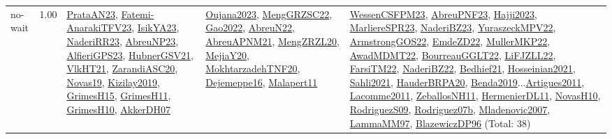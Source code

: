 {\begin{longtable}{p{3cm}r>{\raggedright\arraybackslash}p{6cm}>{\raggedright\arraybackslash}p{6cm}>{\raggedright\arraybackslash}p{8cm}}
\index{no-wait}\index{Concepts!no-wait}no-wait &  1.00 & \hyperref[detail:PrataAN23]{PrataAN23}, \hyperref[detail:Fatemi-AnarakiTFV23]{Fatemi-AnarakiTFV23}, \hyperref[detail:IsikYA23]{IsikYA23}, \hyperref[detail:NaderiRR23]{NaderiRR23}, \hyperref[detail:AbreuNP23]{AbreuNP23}, \hyperref[detail:AlfieriGPS23]{AlfieriGPS23}, \hyperref[detail:HubnerGSV21]{HubnerGSV21}, \hyperref[detail:VlkHT21]{VlkHT21}, \hyperref[detail:ZarandiASC20]{ZarandiASC20}, \hyperref[detail:Novas19]{Novas19}, \hyperref[detail:Kizilay2019]{Kizilay2019}, \hyperref[detail:GrimesH15]{GrimesH15}, \hyperref[detail:GrimesH11]{GrimesH11}, \hyperref[detail:GrimesH10]{GrimesH10}, \hyperref[detail:AkkerDH07]{AkkerDH07} & \hyperref[detail:Oujana2023]{Oujana2023}, \hyperref[detail:MengGRZSC22]{MengGRZSC22}, \hyperref[detail:Gao2022]{Gao2022}, \hyperref[detail:AbreuN22]{AbreuN22}, \hyperref[detail:AbreuAPNM21]{AbreuAPNM21}, \hyperref[detail:MengZRZL20]{MengZRZL20}, \hyperref[detail:MejiaY20]{MejiaY20}, \hyperref[detail:MokhtarzadehTNF20]{MokhtarzadehTNF20}, \hyperref[detail:Dejemeppe16]{Dejemeppe16}, \hyperref[detail:Malapert11]{Malapert11} & \hyperref[detail:WessenCSFPM23]{WessenCSFPM23}, \hyperref[detail:AbreuPNF23]{AbreuPNF23}, \hyperref[detail:Hajji2023]{Hajji2023}, \hyperref[detail:MarliereSPR23]{MarliereSPR23}, \hyperref[detail:NaderiBZ23]{NaderiBZ23}, \hyperref[detail:YuraszeckMPV22]{YuraszeckMPV22}, \hyperref[detail:ArmstrongGOS22]{ArmstrongGOS22}, \hyperref[detail:EmdeZD22]{EmdeZD22}, \hyperref[detail:MullerMKP22]{MullerMKP22}, \hyperref[detail:AwadMDMT22]{AwadMDMT22}, \hyperref[detail:BourreauGGLT22]{BourreauGGLT22}, \hyperref[detail:LiFJZLL22]{LiFJZLL22}, \hyperref[detail:FarsiTM22]{FarsiTM22}, \hyperref[detail:NaderiBZ22]{NaderiBZ22}, \hyperref[detail:Bedhief21]{Bedhief21}, \hyperref[detail:Hosseinian2021]{Hosseinian2021}, \hyperref[detail:Sahli2021]{Sahli2021}, \hyperref[detail:HauderBRPA20]{HauderBRPA20}, \hyperref[detail:Benda2019]{Benda2019}...\hyperref[detail:Artigues2011]{Artigues2011}, \hyperref[detail:Lacomme2011]{Lacomme2011}, \hyperref[detail:ZeballosNH11]{ZeballosNH11}, \hyperref[detail:HermenierDL11]{HermenierDL11}, \hyperref[detail:NovasH10]{NovasH10}, \hyperref[detail:RodriguezS09]{RodriguezS09}, \hyperref[detail:Rodriguez07b]{Rodriguez07b}, \hyperref[detail:Mladenovic2007]{Mladenovic2007}, \hyperref[detail:LammaMM97]{LammaMM97}, \hyperref[detail:BlazewiczDP96]{BlazewiczDP96} (Total: 38)\\

\end{longtable}}
